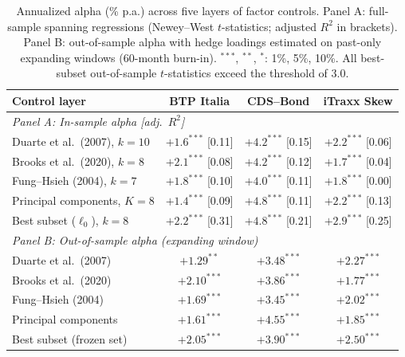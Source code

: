\begin{table}[t]
\centering
\caption{Annualized alpha (\% p.a.) across five layers of factor controls.
Panel A: full-sample spanning regressions (Newey--West $t$-statistics; adjusted
$R^2$ in brackets). Panel B: out-of-sample alpha with hedge loadings estimated
on past-only expanding windows (60-month burn-in). $^{***}$, $^{**}$, $^{*}$:
1\%, 5\%, 10\%. All best-subset out-of-sample $t$-statistics exceed the
\citet{harvey2016and} threshold of 3.0.
\label{tab:alpha_layers}}
\small
\begin{tabular}{lccc}
\toprule
Control layer & BTP Italia & CDS--Bond & iTraxx Skew \\
\midrule
\multicolumn{4}{l}{\emph{Panel A: In-sample alpha [adj.\ $R^2$]}}\\
Duarte et al.\ (2007), $k{=}10$   & $+1.6^{***}$ [0.11] & $+4.2^{***}$ [0.15] & $+2.2^{***}$ [0.06] \\
Brooks et al.\ (2020), $k{=}8$    & $+2.1^{***}$ [0.08] & $+4.2^{***}$ [0.12] & $+1.7^{***}$ [0.04] \\
Fung--Hsieh (2004), $k{=}7$       & $+1.8^{***}$ [0.10] & $+4.0^{***}$ [0.11] & $+1.8^{***}$ [0.00] \\
Principal components, $K{=}8$     & $+1.4^{***}$ [0.09] & $+4.8^{***}$ [0.11] & $+2.2^{***}$ [0.13] \\
Best subset ($\ell_0$), $k{=}8$   & $+2.2^{***}$ [0.31] & $+4.8^{***}$ [0.21] & $+2.9^{***}$ [0.25] \\
\midrule
\multicolumn{4}{l}{\emph{Panel B: Out-of-sample alpha (expanding window)}}\\
Duarte et al.\ (2007)             & $+1.29^{**}$  & $+3.48^{***}$ & $+2.27^{***}$ \\
Brooks et al.\ (2020)             & $+2.10^{***}$ & $+3.86^{***}$ & $+1.77^{***}$ \\
Fung--Hsieh (2004)                & $+1.69^{***}$ & $+3.45^{***}$ & $+2.02^{***}$ \\
Principal components              & $+1.61^{***}$ & $+4.55^{***}$ & $+1.85^{***}$ \\
Best subset (frozen set)          & $+2.05^{***}$ & $+3.90^{***}$ & $+2.50^{***}$ \\
\bottomrule
\end{tabular}
\end{table}
